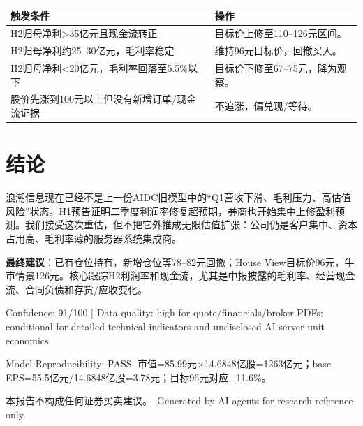 \documentclass[a4paper,11pt,fontset=none]{ctexart}
\newcommand{\reportdisclaimer}{本报告不构成任何证券买卖建议。}
\begin{document}
\noindent\begin{tabularx}{\textwidth}{L{4.0cm}X}
\toprule
\textbf{触发条件} & \textbf{操作} \\
\midrule
H2归母净利>35亿元且现金流转正 & 目标价上修至110--126元区间。 \\
H2归母净利约25--30亿元，毛利率稳定 & 维持96元目标价，回撤买入。 \\
H2归母净利<20亿元，毛利率回落至5.5\%以下 & 目标价下修至67--75元，降为观察。 \\
股价先涨到100元以上但没有新增订单/现金流证据 & 不追涨，偏兑现/等待。 \\
\bottomrule
\end{tabularx}

\section{结论}

浪潮信息现在已经不是上一份AIDC旧模型中的“Q1营收下滑、毛利压力、高估值风险”状态。H1预告证明二季度利润率修复超预期，券商也开始集中上修盈利预测。我们接受这次重估，但不把它外推成无限估值扩张：公司仍是客户集中、资本占用高、毛利率薄的服务器系统集成商。

\textbf{最终建议}：已有仓位持有，新增仓位等78--82元回撤；House View目标价96元，牛市情景126元。核心跟踪H2利润率和现金流，尤其是中报披露的毛利率、经营现金流、合同负债和存货/应收变化。

\vfill
\begin{disclosurebox}[Metadata]
\footnotesize
Confidence: 91/100 \quad | \quad
Data quality: high for quote/financials/broker PDFs; conditional for detailed technical indicators and undisclosed AI-server unit economics.

\vspace{0.3em}
Model Reproducibility: PASS. 市值=85.99元$\times$14.6848亿股=1263亿元；base EPS=55.5亿元/14.6848亿股=3.78元；目标96元对应+11.6\%。

\vspace{0.4em}
{\tiny\reportdisclaimer\ Generated by AI agents for research reference only.}
\end{disclosurebox}
\end{document}
